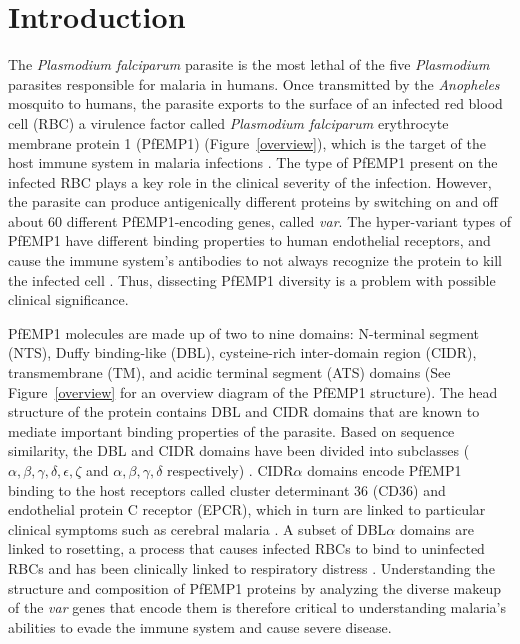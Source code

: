 \documentclass[10pt,twocolumn,superscriptaddress]{revtex4-1}
\newcommand{\var}{{\it var}\xspace}
\newcommand{\pfem}{{PfEMP1}\xspace}
\newcommand{\dbla}{{DBL$\alpha$}\xspace}
\newcommand{\cidra}{{CIDR$\alpha$}\xspace}
\begin{document}
\section{Introduction} 
The \textit{Plasmodium falciparum} parasite is the most lethal of the five \textit{Plasmodium} parasites responsible for malaria in humans. Once transmitted by the \textit{Anopheles} mosquito to humans, the parasite exports to the surface of an infected red blood cell (RBC) a virulence factor called \textit{Plasmodium falciparum} erythrocyte membrane protein 1 (\pfem) (Figure~\ref{overview}), which is the target of the host immune system in malaria infections \cite{chan2012}. The type of PfEMP1 present on the infected RBC plays a key role in the clinical severity of the infection. However, the parasite can produce antigenically different proteins by switching on and off about 60 different PfEMP1-encoding genes, called \var \cite{gardner2002}. The hyper-variant types of PfEMP1 have different binding properties to human endothelial receptors, and cause the immune system's antibodies to not always recognize the protein to kill the infected cell \cite{gardner2002}. Thus, dissecting PfEMP1 diversity is a problem with possible clinical significance. 



PfEMP1 molecules are made up of two to nine domains: N-terminal segment (NTS), Duffy binding-like (DBL), cysteine-rich inter-domain region (CIDR), transmembrane (TM), and acidic terminal segment (ATS) domains \cite{rask2010} (See Figure~\ref{overview} for an overview diagram of the \pfem structure). The head structure of the protein contains DBL and CIDR domains that are known to mediate important binding properties of the parasite. Based on sequence similarity, the DBL and CIDR domains have been divided into subclasses ($\alpha, \beta, \gamma, \delta, \epsilon , \zeta$ and $\alpha, \beta, \gamma, \delta$ respectively) \cite{rask2010} . \cidra domains encode PfEMP1 binding to the host receptors called cluster determinant 36 (CD36) and endothelial protein C receptor (EPCR), which in turn are linked to particular clinical symptoms such as cerebral malaria \cite{hsieh2016}. A subset of \dbla domains are linked to rosetting, a process that causes infected RBCs to bind to uninfected RBCs and has been clinically linked to respiratory distress \cite{lau2015}. Understanding the structure and composition of PfEMP1 proteins by analyzing the diverse makeup of the \var genes that encode them is therefore critical to understanding malaria's abilities to evade the immune system and cause severe disease. 
\end{document}
